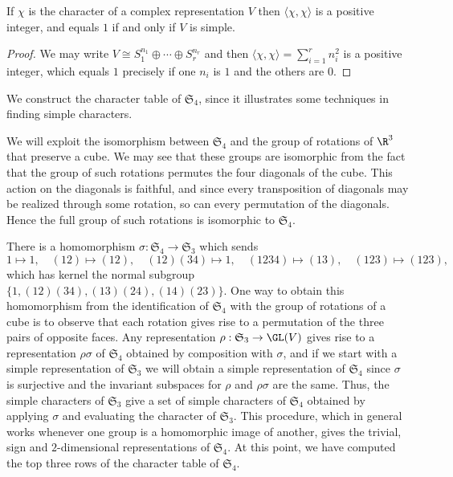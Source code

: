 \begin{corollary}\label{representation simple iff char orthonormal}
If $\chi$ is the character of a complex representation $V$ then $\langle\chi,\chi\rangle$ is a positive integer, and equals $1$ if and only if $V$ is simple.
\end{corollary}
\begin{proof}
We may write $V\cong S_1^{n_1}\oplus\cdots\oplus S_r^{n_r}$ and then $\langle\chi,\chi\rangle=\sum_{i=1}^{r}n_i^2$ is a positive integer, which equals $1$ precisely if one $n_i$ is $1$ and the others are $0$.
\end{proof}
\begin{example}\label{representation of S_4}
We construct the character table of $\mathfrak{S}_4$, since it illustrates some techniques in finding simple characters.\par
We will exploit the isomorphism between $\mathfrak{S}_4$ and the group of rotations of $\R^3$ that preserve a cube. We may see that these groups are isomorphic from the fact that the group of such rotations permutes the four diagonals of the cube. This action on the diagonals is faithful, and since every transposition of diagonals may be realized through some rotation, so can every permutation of the diagonals. Hence the full group of such rotations is isomorphic to $\mathfrak{S}_4$.\par
There is a homomorphism $\sigma:\mathfrak{S}_4\to\mathfrak{S}_3$ which sends
\[1\mapsto 1,\quad (12)\mapsto(12),\quad (12)(34)\mapsto 1,\quad (1234)\mapsto(13),\quad (123)\mapsto(123),\]
which has kernel the normal subgroup $\{1,(12)(34),(13)(24),(14)(23)\}$. One way to obtain this homomorphism from the identification of $\mathfrak{S}_4$ with the group of rotations of a cube is to observe that each rotation gives rise to a permutation of the three pairs of opposite faces. Any representation $\rho:\mathfrak{S}_3\to\GL(V)$ gives rise to a representation $\rho\sigma$ of $\mathfrak{S}_4$ obtained by composition with $\sigma$, and if we start with a simple representation of $\mathfrak{S}_3$ we will obtain a simple representation of $\mathfrak{S}_4$ since $\sigma$ is surjective and the invariant subspaces for $\rho$ and $\rho\sigma$ are the same. Thus, the simple characters of $\mathfrak{S}_3$ give a set of simple characters of $\mathfrak{S}_4$ obtained by applying $\sigma$ and evaluating the character of $\mathfrak{S}_3$. This procedure, which in general works whenever one group is a homomorphic image of another, gives the trivial, sign and $2$-dimensional representations of $\mathfrak{S}_4$. At this point, we have computed the top three rows of the character table of $\mathfrak{S}_4$.\par

\end{example}
